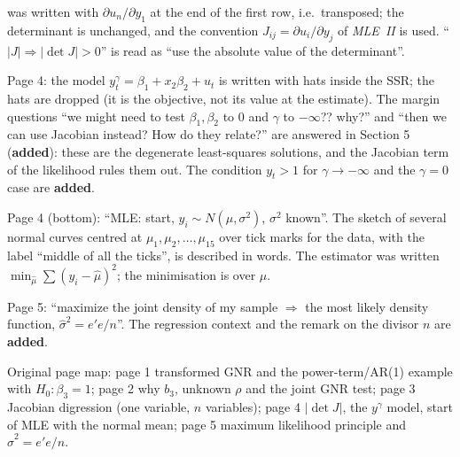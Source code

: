 \documentclass[11pt]{article}
\begin{document}
\begin{transcriptnotes}
       was written with $\partial u_{n}/\partial y_{1}$ at the end of the first row, i.e.\ transposed;
       the determinant is unchanged, and the convention $J_{ij}=\partial u_{i}/\partial y_{j}$ of
       \emph{MLE~II} is used. ``$\lvert J\rvert\Rightarrow\lvert\det J\rvert>0$'' is read as ``use the
       absolute value of the determinant''.
 \item Page 4: the model $y_{t}^{\gamma}=\beta_{1}+x_{2}\beta_{2}+u_{t}$ is written with hats inside the
       SSR; the hats are dropped (it is the objective, not its value at the estimate). The
       margin questions ``we might need to test $\beta_{1},\beta_{2}$ to 0 and $\gamma$ to $-\infty$??
       why?'' and ``then we can use Jacobian instead? How do they relate?'' are answered in
       Section 5 (\textbf{added}): these are the degenerate least-squares solutions, and the
       Jacobian term of the likelihood rules them out. The condition $y_{t}>1$ for
       $\gamma\to-\infty$ and the $\gamma=0$ case are \textbf{added}.
 \item Page 4 (bottom): ``MLE: start, $y_{i}\sim N(\mu,\sigma^{2})$, $\sigma^{2}$ known''. The sketch of
       several normal curves centred at $\mu_{1},\mu_{2},\ldots,\mu_{15}$ over tick marks for the
       data, with the label ``middle of all the ticks'', is described in words. The
       estimator was written $\min_{\hat\mu}\sum(y_{i}-\hat\mu)^{2}$; the minimisation is over $\mu$.
 \item Page 5: ``maximize the joint density of my sample $\Rightarrow$ the most likely density
       function, $\hat\sigma^{2}=e'e/n$''. The regression context and the remark on the divisor
       $n$ are \textbf{added}.
 \item Original page map: page 1 transformed GNR and the power-term/AR(1) example with
       $H_{0}:\beta_{3}=1$; page 2 why $b_{3}$, unknown $\rho$ and the joint GNR test; page 3
       Jacobian digression (one variable, $n$ variables); page 4 $\lvert\det J\rvert$, the
       $y^{\gamma}$ model, start of MLE with the normal mean; page 5 maximum likelihood principle
       and $\hat\sigma^{2}=e'e/n$.
\end{transcriptnotes}
\end{document}
